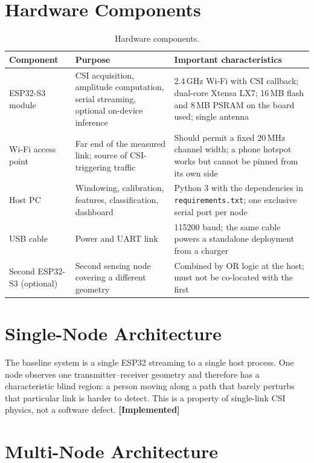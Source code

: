 \documentclass[11pt,a4paper,oneside]{report}
\newcommand{\evidencetag}[2]{{\small\sffamily\bfseries\textcolor{#1}{[#2]}}}
\newcommand{\Impl}{\evidencetag{good}{Implemented}}
\newcommand{\code}[1]{\texttt{\small #1}}
\begin{document}
\noindent

\section{Hardware Components}

\begin{table}[H]
\centering
\caption{Hardware components.}
\label{tab:hw}
\renewcommand{\arraystretch}{1.25}
\begin{tabularx}{\linewidth}{|l|X|X|}
\hline
\textbf{Component} & \textbf{Purpose} & \textbf{Important characteristics} \\
\hline
ESP32-S3 module &
CSI acquisition, amplitude computation, serial streaming, optional on-device
inference &
2.4\,GHz Wi-Fi with CSI callback; dual-core Xtensa LX7; 16\,MB flash and 8\,MB
PSRAM on the board used; single antenna \\
\hline
Wi-Fi access point &
Far end of the measured link; source of CSI-triggering traffic &
Should permit a fixed 20\,MHz channel width; a phone hotspot works but cannot
be pinned from its own side \\
\hline
Host PC &
Windowing, calibration, features, classification, dashboard &
Python 3 with the dependencies in \code{requirements.txt}; one exclusive serial
port per node \\
\hline
USB cable &
Power and UART link &
115200 baud; the same cable powers a standalone deployment from a charger \\
\hline
Second ESP32-S3 (optional) &
Second sensing node covering a different geometry &
Combined by OR logic at the host; must not be co-located with the first \\
\hline
\end{tabularx}
\end{table}

\section{Single-Node Architecture}

The baseline system is a single ESP32 streaming to a single host process. One
node observes one transmitter--receiver geometry and therefore has a
characteristic blind region: a person moving along a path that barely perturbs
that particular link is harder to detect. This is a property of single-link CSI
physics, not a software defect. \Impl

\section{Multi-Node Architecture}
\end{document}
